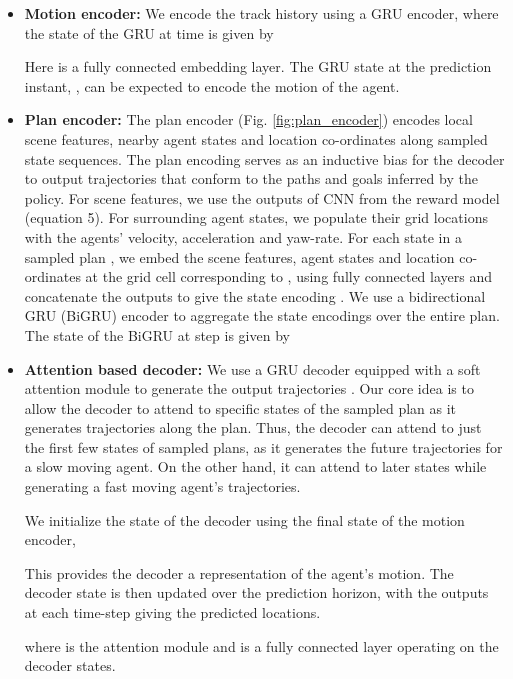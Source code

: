 \documentclass[journal]{IEEEtran}
\begin{document}
\begin{itemize}


\vspace{0.05in}
\item \noindent\textbf{Motion encoder:} We encode the track history  using a GRU encoder, where the state of the GRU at time  is given by
 
Here  is a fully connected embedding layer. The GRU state at the prediction instant, , can be expected to encode the motion of the agent.

\vspace{0.05in}
\item \noindent\textbf{Plan encoder:}
The plan encoder (Fig. \ref{fig:plan_encoder}) encodes local scene features, nearby agent states and location co-ordinates along sampled state sequences. The plan encoding serves as an inductive bias for the decoder to output trajectories that conform to the paths and goals inferred by the policy. For scene features, we use the outputs  of CNN from the reward model (equation 5). For surrounding agent states, we populate their grid locations with the agents' velocity, acceleration and yaw-rate. For each state  in a sampled plan , we embed the scene features, agent states and location co-ordinates at the grid cell corresponding to , using fully connected layers and concatenate the outputs to give the state encoding . We use a bidirectional GRU (BiGRU) encoder to aggregate the state encodings over the entire plan. The state of the BiGRU at step  is given by   



\vspace{0.05in}
\item \noindent\textbf{Attention based decoder:} We use a GRU decoder equipped with a soft attention module to generate the output trajectories . Our core idea is to allow the decoder to attend to specific states of the sampled plan  as it generates trajectories along the plan. Thus, the decoder can attend to just the first few states of sampled plans, as it generates the future trajectories for a slow moving agent. On the other hand, it can attend to later states while generating a fast moving agent's trajectories.   

We initialize the state of the decoder using the final state of the motion encoder,

This provides the decoder a representation of the agent's motion. The decoder state is then updated over the prediction horizon, with the outputs at each time-step giving the predicted locations.




where  is the attention module and  is a fully connected layer operating on the decoder states. 

\end{itemize}
\end{document}
